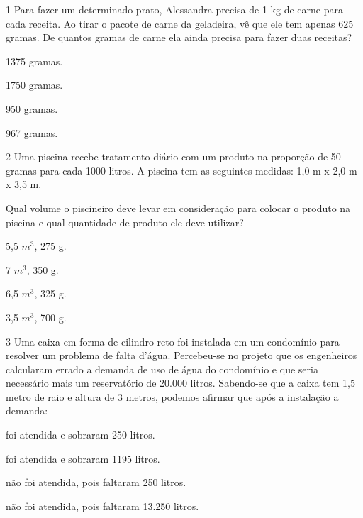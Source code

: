 \num{1} Para fazer um determinado prato, Alessandra precisa de 1 kg de carne
para cada receita. Ao tirar o pacote de carne da geladeira, vê que ele
tem apenas 625 gramas. De quantos gramas de carne ela ainda precisa para
fazer duas receitas?

\begin{escolha}

  \item 1375 gramas.

  \item 1750 gramas.

  \item 950 gramas.

  \item 967 gramas.

\end{escolha}

\num{2} Uma piscina recebe tratamento diário com um produto na proporção de
50 gramas para cada 1000 litros. A piscina tem as seguintes medidas:
1,0 m x 2,0 m x 3,5 m. 

Qual volume o piscineiro deve levar em
consideração para colocar o produto na piscina e qual quantidade de
produto ele deve utilizar?

\begin{escolha}

  \item 5,5 $m^3$, 275 g.

  \item 7 $m^3$, 350 g.

  \item 6,5 $m^3$, 325 g.

  \item 3,5 $m^3$, 700 g.

\end{escolha}


\num{3} Uma caixa em forma de cilindro reto foi instalada em um condomínio
para resolver um problema de falta d'água. Percebeu-se no projeto que os
engenheiros calcularam errado a demanda de uso de água do condomínio e
que seria necessário mais um reservatório de 20.000 litros. Sabendo-se
que a caixa tem 1,5 metro de raio e altura de 3 metros, podemos afirmar
que após a instalação a demanda:

\begin{escolha}
  \item foi atendida e sobraram 250 litros.

  \item foi atendida e sobraram 1195 litros.

  \item não foi atendida, pois faltaram 250 litros.

  \item não foi atendida, pois faltaram 13.250 litros.
\end{escolha}


